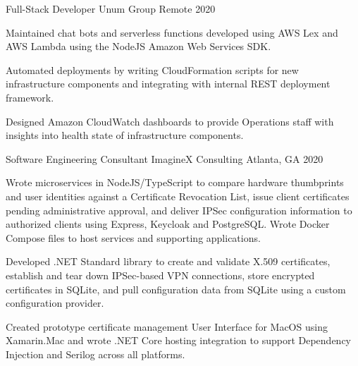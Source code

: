 

\begin{cventries}

  \cventry
    {Full-Stack Developer} %
    {Unum Group} %
    {Remote} %
    {2020} %
    {
      \begin{cvitems}
        \item {Maintained chat bots and serverless functions developed using AWS Lex and AWS Lambda using the NodeJS Amazon Web Services SDK.}
        \item {Automated deployments by writing CloudFormation scripts for new infrastructure components and integrating with internal REST deployment framework.}
        \item {Designed Amazon CloudWatch dashboards to provide Operations staff with insights into health state of infrastructure components.}
      \end{cvitems}
    }

  \cventry
    {Software Engineering Consultant} %
    {ImagineX Consulting} %
    {Atlanta, GA} %
    {2020} %
    {
      \begin{cvitems} %
        \item {Wrote microservices in NodeJS/TypeScript to compare hardware thumbprints and user identities against a Certificate Revocation List, issue client certificates pending administrative approval, and deliver IPSec configuration information to authorized clients using Express, Keycloak and PostgreSQL. Wrote Docker Compose files to host services and supporting applications.}
        \item {Developed .NET Standard library to create and validate X.509 certificates, establish and tear down IPSec-based VPN connections, store encrypted certificates in SQLite, and pull configuration data from SQLite using a custom configuration provider.}
        \item {Created prototype certificate management User Interface for MacOS using Xamarin.Mac and wrote .NET Core hosting integration to support Dependency Injection and Serilog across all platforms.}
      \end{cvitems}
    }


\end{cventries}
